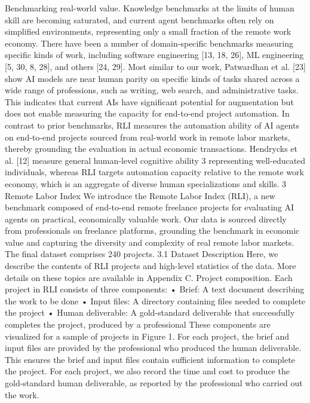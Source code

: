 Benchmarking real-world value.
Knowledge benchmarks at the limits of human skill are becoming
saturated, and current agent benchmarks often rely on simplified environments, representing only
a small fraction of the remote work economy. There have been a number of domain-specific
benchmarks measuring specific kinds of work, including software engineering [13, 18, 26], ML
engineering [5, 30, 8, 28], and others [24, 29]. Most similar to our work, Patwardhan et al. [23]
show AI models are near human parity on specific kinds of tasks shared across a wide range of
professions, such as writing, web search, and administrative tasks. This indicates that current AIs
have significant potential for augmentation but does not enable measuring the capacity for end-to-end
project automation.
In contrast to prior benchmarks, RLI measures the automation ability of AI agents on end-to-end
projects sourced from real-world work in remote labor markets, thereby grounding the evaluation in
actual economic transactions. Hendrycks et al. [12] measure general human-level cognitive ability
3
representing well-educated individuals, whereas RLI targets automation capacity relative to the
remote work economy, which is an aggregate of diverse human specializations and skills.
3
Remote Labor Index
We introduce the Remote Labor Index (RLI), a new benchmark composed of end-to-end remote
freelance projects for evaluating AI agents on practical, economically valuable work. Our data is
sourced directly from professionals on freelance platforms, grounding the benchmark in economic
value and capturing the diversity and complexity of real remote labor markets. The final dataset
comprises 240 projects.
3.1
Dataset Description
Here, we describe the contents of RLI projects and high-level statistics of the data. More details on
these topics are available in Appendix C.
Project composition.
Each project in RLI consists of three components:
• Brief: A text document describing the work to be done
• Input files: A directory containing files needed to complete the project
• Human deliverable: A gold-standard deliverable that successfully completes the project,
produced by a professional
These components are visualized for a sample of projects in Figure 1. For each project, the brief
and input files are provided by the professional who produced the human deliverable. This ensures
the brief and input files contain sufficient information to complete the project. For each project, we
also record the time and cost to produce the gold-standard human deliverable, as reported by the
professional who carried out the work.
